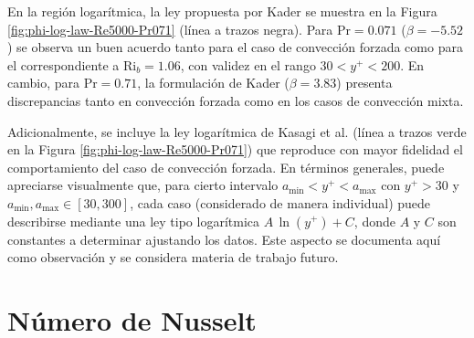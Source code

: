 
En la región logarítmica, la ley propuesta por Kader \cite{kader1981temperature} se muestra en la Figura \ref{fig:phi-log-law-Re5000-Pr071} (línea a trazos negra). Para $\text{Pr}=0\text{.}071$ ($\beta=-5\text{.}52$) se observa un buen acuerdo tanto para el caso de convección forzada como para el correspondiente a $\text{Ri}_b=1\text{.}06$, con validez en el rango $30<y^+<200$. En cambio, para $\text{Pr}=0\text{.}71$, la formulación de Kader ($\beta=3\text{.}83$) presenta discrepancias tanto en convección forzada como en los casos de convección mixta.

Adicionalmente, se incluye la ley logarítmica de Kasagi et al. \cite{kasagi1992direct} (línea a trazos verde en la Figura \ref{fig:phi-log-law-Re5000-Pr071}) que reproduce con mayor fidelidad el comportamiento del caso de convección forzada. En términos generales, puede apreciarse visualmente que, para cierto intervalo $a_{\text{min}}<y^+<a_{\text{max}}$ con $y^+>30$ y $a_{\text{min}},a_{\text{max}}\in[30,300]$, cada caso (considerado de manera individual) puede describirse mediante una ley tipo logarítmica  $A\, \ln(y^+)+C$, donde $A$ y $C$ son constantes a determinar ajustando los datos. Este aspecto se documenta aquí como observación y se considera materia de trabajo futuro.



\newpage
\section{Número de Nusselt} \label{sec:nu}

